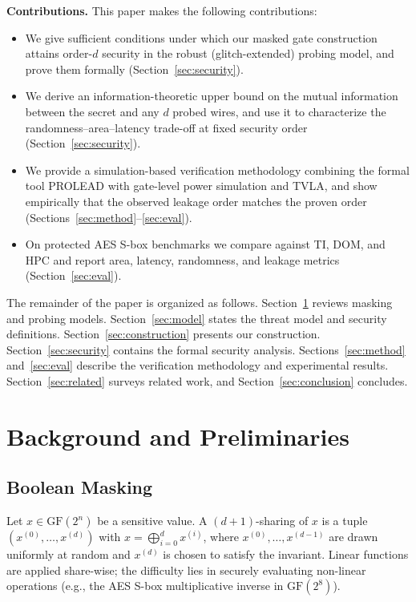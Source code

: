 \documentclass[lettersize,journal]{IEEEtran}
\newcommand{\GF}{\mathrm{GF}}
\newcommand{\share}[2]{#1^{(#2)}}
\begin{document}
\textbf{Contributions.} This paper makes the following contributions:
\begin{itemize}
  \item We give sufficient conditions under which our masked gate construction
        attains order-$d$ security in the robust (glitch-extended) probing
        model, and prove them formally (Section~\ref{sec:security}).
  \item We derive an information-theoretic upper bound on the mutual
        information between the secret and any $d$ probed wires, and use it to
        characterize the randomness--area--latency trade-off at fixed security
        order (Section~\ref{sec:security}).
  \item We provide a simulation-based verification methodology combining the
        formal tool PROLEAD with gate-level power simulation and TVLA, and
        show empirically that the observed leakage order matches the proven
        order (Sections~\ref{sec:method}--\ref{sec:eval}).
  \item On protected AES S-box benchmarks we compare against TI, DOM, and HPC
        and report area, latency, randomness, and leakage metrics
        (Section~\ref{sec:eval}).
\end{itemize}

The remainder of the paper is organized as follows.
Section~\ref{sec:background} reviews masking and probing models.
Section~\ref{sec:model} states the threat model and security definitions.
Section~\ref{sec:construction} presents our construction.
Section~\ref{sec:security} contains the formal security analysis.
Sections~\ref{sec:method} and~\ref{sec:eval} describe the verification
methodology and experimental results. Section~\ref{sec:related} surveys related
work, and Section~\ref{sec:conclusion} concludes.

\section{Background and Preliminaries}
\label{sec:background}

\subsection{Boolean Masking}
Let $x \in \GF(2^n)$ be a sensitive value. A $(d{+}1)$-sharing of $x$ is a tuple
$(\share{x}{0},\dots,\share{x}{d})$ with
$x = \bigoplus_{i=0}^{d}\share{x}{i}$, where $\share{x}{0},\dots,\share{x}{d-1}$
are drawn uniformly at random and $\share{x}{d}$ is chosen to satisfy the
invariant. Linear functions are applied share-wise; the difficulty lies in
securely evaluating non-linear operations (e.g., the AES S-box multiplicative
inverse in $\GF(2^8)$).
\end{document}
